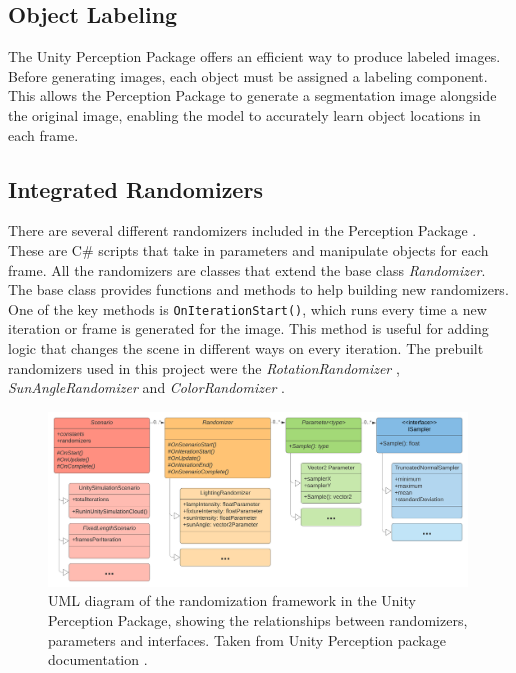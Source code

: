 \subsection{Object Labeling}
The Unity Perception Package offers an efficient way to produce labeled images. Before generating images, each object must be assigned a labeling component. This allows the Perception Package to generate a segmentation image alongside the original image, enabling the model to accurately learn object locations in each frame.



\subsection{Integrated Randomizers}
\label{section:Integrated Randomizers}
There are several different randomizers included in the Perception Package \cite{unity-perception2022}. These are C\# scripts that take in parameters and manipulate objects for each frame. All the randomizers are classes that extend the base class \textit{Randomizer}. The base class provides functions and methods to help building new randomizers. One of the key methods is \texttt{OnIterationStart()}, which runs every time a new iteration or frame is generated for the image. This method is useful for adding logic that changes the scene in different ways on every iteration. The prebuilt randomizers used in this project were the \textit{RotationRandomizer} \cite{rotation_randomizer}, \textit{SunAngleRandomizer} \cite{sun_angle_randomizer} and \textit{ColorRandomizer} \cite{color_randomizer}.

\begin{figure}[H]
    \centering
    \includegraphics[width=0.99\textwidth]{Figures/randomization_uml.png}
    \caption{UML diagram of the randomization framework in the Unity Perception Package, showing the relationships between randomizers, parameters and interfaces. Taken from Unity Perception package documentation \cite{UMLdiagram}.}
    \label{fig:randomizer class uml}
    
\end{figure}


